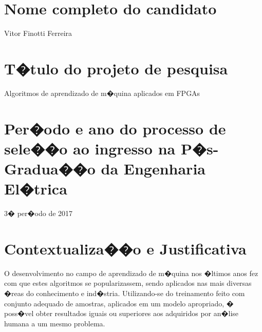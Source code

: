 \documentclass[a4paper,11pt,oneside]{article}
\begin{document}
%


	\sffamily
	\singlespace
	\section{Nome completo do candidato}
	\vspace{-1cm}
	\noindent\hrulefill

	Vitor Finotti Ferreira

	\sffamily
	\section{T�tulo do projeto de pesquisa}
	\vspace{-1cm}
	\noindent\hrulefill

	Algoritmos de aprendizado de m�quina aplicados em FPGAs

	\section{Per�odo e ano do processo de sele��o ao ingresso na P�s-Gradua��o da Engenharia El�trica}
	\vspace{-1cm}
	\noindent\hrulefill

	3� per�odo de 2017

	\section{Contextualiza��o e Justificativa}
	\vspace{-1cm}
	\noindent\hrulefill

        O desenvolvimento no campo de aprendizado de m�quina nos �ltimos anos
        fez com que estes algoritmos se popularizassem, sendo aplicados nas mais
        diversas �reas do conhecimento e ind�stria. Utilizando-se do treinamento
        feito com conjunto adequado de amostras, aplicados em um modelo
        apropriado, � poss�vel obter resultados iguais ou superiores aos
        adquiridos por an�lise humana a um mesmo problema.
\end{document}
